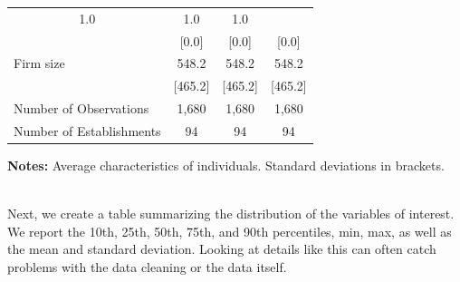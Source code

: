 \documentclass{article}
\begin{document}
\begin{table}[htbp]
\begin{threeparttable}
\begin{tabular}{llll}
  \multicolumn{1}{c}{1.0} &
  \multicolumn{1}{c}{1.0} &
  \multicolumn{1}{c}{1.0} \\
\multicolumn{1}{l}{} &
  \multicolumn{1}{c}{[0.0]} &
  \multicolumn{1}{c}{[0.0]} &
  \multicolumn{1}{c}{[0.0]} \\
\multicolumn{1}{l}{Firm size} &
  \multicolumn{1}{c}{548.2} &
  \multicolumn{1}{c}{548.2} &
  \multicolumn{1}{c}{548.2} \\
\multicolumn{1}{l}{} &
  \multicolumn{1}{c}{[465.2]} &
  \multicolumn{1}{c}{[465.2]} &
  \multicolumn{1}{c}{[465.2]} \\
\midrule
\multicolumn{1}{l}{Number of Observations} &
  \multicolumn{1}{c}{1,680} &
  \multicolumn{1}{c}{1,680} &
  \multicolumn{1}{c}{1,680} \\
\multicolumn{1}{l}{Number of Establishments} &
  \multicolumn{1}{c}{94} &
  \multicolumn{1}{c}{94} &
  \multicolumn{1}{c}{94} \\
\bottomrule
\end{tabular}

 \footnotesize  
\textbf{Notes:} Average characteristics of individuals. Standard deviations in brackets. 
\end{threeparttable} 
\end{table}
\\ Next, we create a table summarizing the distribution of the variables of interest.
We report the 10th, 25th, 50th, 75th, and 90th percentiles, min, max, as well as the mean and standard deviation.
Looking at details like this can often catch problems with the data cleaning or the data itself.
\end{document}
